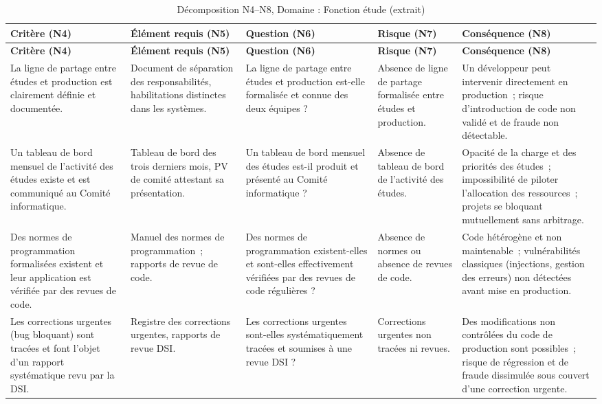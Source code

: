 \begin{longtable}{p{3.2cm}p{3cm}p{2.8cm}p{2.6cm}p{2.8cm}}
\caption{Décomposition N4--N8, Domaine : Fonction étude (extrait)} \\
\toprule
\textbf{Critère (N4)} & \textbf{Élément requis (N5)} & \textbf{Question (N6)} & \textbf{Risque (N7)} & \textbf{Conséquence (N8)} \\
\midrule
\endfirsthead
\toprule
\textbf{Critère (N4)} & \textbf{Élément requis (N5)} & \textbf{Question (N6)} & \textbf{Risque (N7)} & \textbf{Conséquence (N8)} \\
\midrule
\endhead
\bottomrule
\endlastfoot

La ligne de partage entre études et production est clairement définie et documentée. &
Document de séparation des responsabilités, habilitations distinctes dans les systèmes. &
La ligne de partage entre études et production est-elle formalisée et connue des deux équipes ? &
Absence de ligne de partage formalisée entre études et production. &
Un développeur peut intervenir directement en production~; risque d'introduction de code non validé et de fraude non détectable. \\
\addlinespace

Un tableau de bord mensuel de l'activité des études existe et est communiqué au Comité informatique. &
Tableau de bord des trois derniers mois, PV de comité attestant sa présentation. &
Un tableau de bord mensuel des études est-il produit et présenté au Comité informatique ? &
Absence de tableau de bord de l'activité des études. &
Opacité de la charge et des priorités des études~; impossibilité de piloter l'allocation des ressources~; projets se bloquant mutuellement sans arbitrage. \\
\addlinespace

Des normes de programmation formalisées existent et leur application est vérifiée par des revues de code. &
Manuel des normes de programmation~; rapports de revue de code. &
Des normes de programmation existent-elles et sont-elles effectivement vérifiées par des revues de code régulières ? &
Absence de normes ou absence de revues de code. &
Code hétérogène et non maintenable~; vulnérabilités classiques (injections, gestion des erreurs) non détectées avant mise en production. \\
\addlinespace

Les corrections urgentes (bug bloquant) sont tracées et font l'objet d'un rapport systématique revu par la DSI. &
Registre des corrections urgentes, rapports de revue DSI. &
Les corrections urgentes sont-elles systématiquement tracées et soumises à une revue DSI ? &
Corrections urgentes non tracées ni revues. &
Des modifications non contrôlées du code de production sont possibles~; risque de régression et de fraude dissimulée sous couvert d'une correction urgente. \\

\end{longtable}

